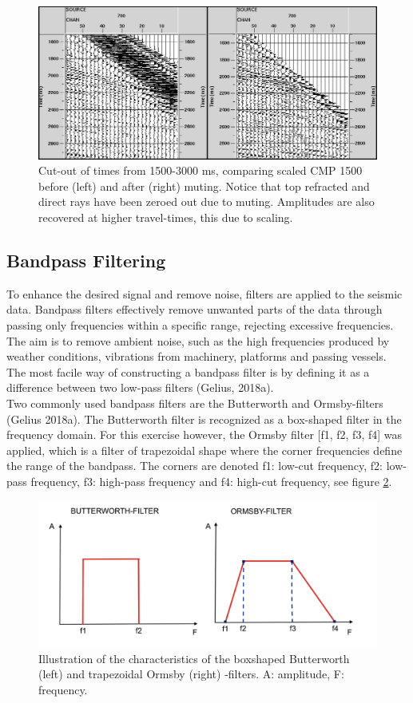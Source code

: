 \documentclass[10pt,a4paper]{article}
\begin{document}
\begin{figure}[H]
\includegraphics[width=\textwidth]{fig8.jpg}
\caption{Cut-out of times from 1500-3000 ms, comparing scaled CMP 1500 before (left) and after (right) muting. Notice that top refracted and direct rays have been zeroed out due to muting. Amplitudes are also recovered at higher travel-times, this due to scaling.}
\label{fig8}
\end{figure}

\subsection{Bandpass Filtering}


To enhance the desired signal and remove noise, filters are applied to the seismic data. Bandpass filters effectively remove unwanted parts of the data through passing only frequencies within a specific range, rejecting excessive frequencies. The aim is to remove ambient noise, such as the high frequencies produced by weather conditions, vibrations from machinery, platforms and passing vessels. The most facile way of constructing a bandpass filter is by defining it as a difference between two low-pass filters (Gelius, 2018a). 
\\
Two commonly used bandpass filters are the Butterworth and Ormsby-filters (Gelius 2018a). The Butterworth filter is recognized as a box-shaped filter in the frequency domain. For this exercise however, the Ormsby filter [f1, f2, f3, f4] was applied, which is a filter of trapezoidal shape where the corner frequencies define the range of the bandpass. The corners are denoted f1: low-cut frequency, f2: low-pass frequency, f3: high-pass frequency and f4: high-cut frequency, see figure \ref{fig9}.

\begin{figure}[H]
\includegraphics[width=\textwidth]{fig9.jpg}
\caption{Illustration of the characteristics of the boxshaped Butterworth (left) and trapezoidal Ormsby (right) -filters. A: amplitude, F: frequency.}
\label{fig9}
\end{figure}
\end{document}
